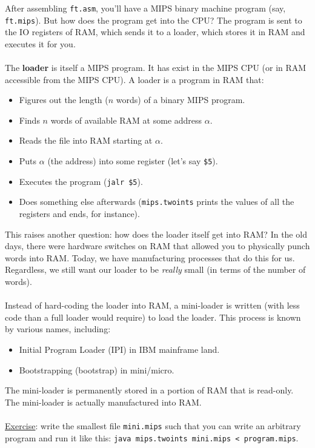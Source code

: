 \documentclass[]{article}
\theoremstyle{definition}
\begin{document}
			After assembling \verb+ft.asm+, you'll have a MIPS binary machine program (say, \verb+ft.mips+). But how does the program get into the CPU? The program is sent to the IO registers of RAM, which sends it to a loader, which stores it in RAM and executes it for you.
			\\ \\
			The \textbf{loader} is itself a MIPS program. It has exist in the MIPS CPU (or in RAM accessible from the MIPS CPU). A loader is a program in RAM that:
			\begin{itemize}
				\item Figures out the length ($n$ words) of a binary MIPS program.
				\item Finds $n$ words of available RAM at some address $\alpha$.
				\item Reads the file into RAM starting at $\alpha$.
				\item Puts $\alpha$ (the address) into some register (let's say \verb+$5+).
				\item Executes the program (\verb+jalr $5+).
				\item Does something else afterwards (\verb+mips.twoints+ prints the values of all the registers and ends, for instance).
			\end{itemize}
			This raises another question: how does the loader itself get into RAM? In the old days, there were hardware switches on RAM that allowed you to physically punch words into RAM. Today, we have manufacturing processes that do this for us. Regardless, we still want our loader to be \emph{really} small (in terms of the number of words).
			\\ \\
			Instead of hard-coding the loader into RAM, a mini-loader is written (with less code than a full loader would require) to load the loader. This process is known by various names, including:
			\begin{itemize}
				\item Initial Program Loader (IPI) in IBM mainframe land.
				\item Bootstrapping (bootstrap) in mini/micro.
			\end{itemize}

			The mini-loader is permanently stored in a portion of RAM that is read-only. The mini-loader is actually manufactured into RAM.
			\\ \\
			\underline{Exercise}: write the smallest file \verb+mini.mips+ such that you can write an arbitrary program and run it like this: \verb+java mips.twoints mini.mips < program.mips+.
\end{document}

